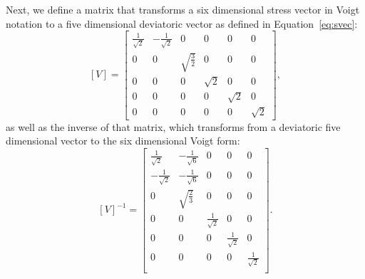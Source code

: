 \documentclass[preprint,3p,times,sort&compress,letterpaper,12pt]{elsarticle} %
\begin{document}
Next, we define a matrix that transforms a six dimensional stress vector in Voigt notation to a five dimensional deviatoric vector as defined in Equation~\ref{eq:svec}:
\begin{equation}
    \left[V\right] = 
    \begin{bmatrix}
        \frac{1}{\sqrt{2}} & -\frac{1}{\sqrt{2}} & 0 & 0 & 0 & 0 \\
        0 & 0 & \sqrt{\frac{3}{2}} & 0 & 0 & 0 \\
        0 & 0 & 0 & \sqrt{2} & 0 & 0 \\
        0 & 0 & 0 & 0 & \sqrt{2} & 0 \\
        0 & 0 & 0 & 0 & 0 & \sqrt{2}
    \end{bmatrix} ,
\end{equation}
as well as the inverse of that matrix, which transforms from a deviatoric five dimensional vector to the six dimensional Voigt form:
\begin{equation}
    \left[V\right]^{-1} = 
    \begin{bmatrix}
        \frac{1}{\sqrt{2}} & -\frac{1}{\sqrt{6}} & 0 & 0 & 0 \\
        -\frac{1}{\sqrt{2}} & -\frac{1}{\sqrt{6}} & 0 & 0 & 0 \\
        0 & \sqrt{\frac{2}{3}} & 0 & 0 & 0 \\
        0 & 0 & \frac{1}{\sqrt{2}} & 0 & 0 \\
        0 & 0 & 0 & \frac{1}{\sqrt{2}} & 0 \\
        0 & 0 & 0 & 0 & \frac{1}{\sqrt{2}} \\
    \end{bmatrix} .
\end{equation}
\end{document}
